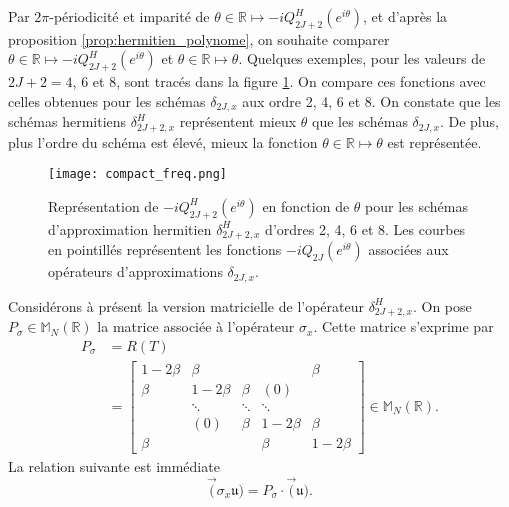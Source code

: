 Par $2 \pi$-périodicité et imparité de $\theta \in \mathbb{R} \mapsto - i Q_{2J+2}^H(e^{i \theta})$, et d'après la proposition \ref{prop:hermitien_polynome}, on souhaite comparer $\theta \in \mathbb{R} \mapsto - i Q_{2J+2}^H(e^{i \theta})$ et $\theta \in \mathbb{R} \mapsto \theta$. Quelques exemples, pour les valeurs de $2J+2 = 4$, $6$ et $8$, sont tracés dans la figure \ref{fig:freq_herm}. On compare ces fonctions avec celles obtenues pour les schémas $\delta_{2J,x}$ aux ordre 2, 4, 6 et 8. On constate que les schémas hermitiens $\delta_{2J+2,x}^H$ représentent mieux $\theta$ que les schémas $\delta_{2J,x}$. De plus, plus l'ordre du schéma est élevé, mieux la fonction $\theta \in \mathbb{R} \mapsto \theta$ est représentée.

\begin{figure}[htbp]
\begin{center}
\texttt{[image: compact\_freq.png]}
\end{center}
\caption{Représentation de $-i Q_{2J+2}^H \left( e^{i \theta} \right)$ en fonction de $\theta$ pour les schémas d'approximation hermitien $\delta_{2J+2,x}^H$ d'ordres 2, 4, 6 et 8. Les courbes en pointillés représentent les fonctions $-i Q_{2J}\left( e^{i \theta} \right)$ associées aux opérateurs d'approximations $\delta_{2J,x}$.}
\label{fig:freq_herm}
\end{figure}


Considérons à présent la version matricielle de l'opérateur $\delta_{2J+2,x}^H$. On pose $P_{\sigma} \in \mathbb{M}_N(\mathbb{R})$ la matrice associée à l'opérateur $\sigma_x$. Cette matrice s'exprime par
\begin{align}
P_{\sigma} & = R(T) \\
  & = \begin{bmatrix}
  1 - 2 \beta & \beta &   &   & \beta \\ 
  \beta & 1 - 2 \beta & \beta & (0) &   \\ 
    & \ddots & \ddots & \ddots &   \\ 
    & (0) & \beta & 1 - 2 \beta & \beta \\ 
  \beta &   &   & \beta & 1 - 2 \beta
  \end{bmatrix} \in \mathbb{M}_{N}(\mathbb{R}).
\label{eq:matrice_implicitpart}
\end{align}
La relation suivante est immédiate
\begin{equation}
\vec (\sigma_x \mathfrak{u}) = P_{\sigma} \cdot \vec (\mathfrak{u}).
\end{equation}

